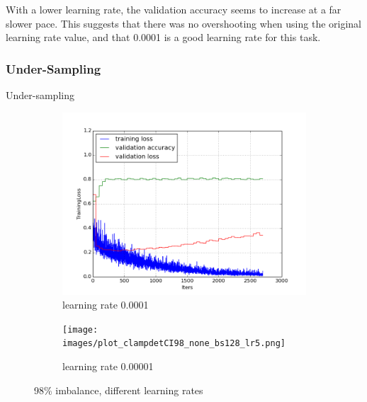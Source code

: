 \documentclass[a4paper,11pt]{article}
\begin{document}
With a lower learning rate, the validation accuracy seems to increase at a far slower pace. This suggests that there was no overshooting when using the original learning rate value, and that 0.0001 is a good learning rate for this task. \\


\subsubsection{Under-Sampling}

Under-sampling 

\begin{figure}
    \centering
    \begin{minipage}[b]{\textwidth}
      \begin{subfigure}{.5\textwidth} 
        \centering
        \includegraphics[scale=0.4]{images/plot_clampdetCI98_us_none_bs128_lr4.png}
        \caption{learning rate 0.0001}\label{fig:2a}
      \end{subfigure}%
      \begin{subfigure}{.5\textwidth} 
        \centering
        \texttt{[image: images/plot\_clampdetCI98\_none\_bs128\_lr5.png]}
        \caption{learning rate 0.00001}\label{fig:2b}
      \end{subfigure} \par \vspace*{20pt} %
      \caption{98\% imbalance, different learning rates}\label{fig:2}
    \end{minipage}%
\end{figure}
\end{document}

